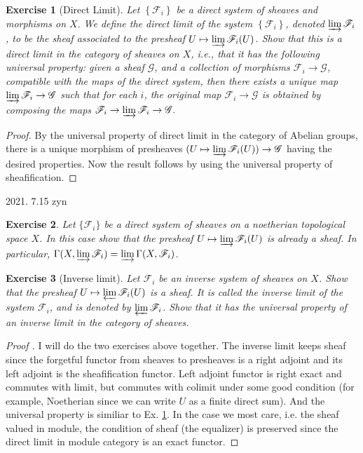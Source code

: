 \documentclass[12pt]{amsart}
\newtheorem{exe}{Exercise}[subsection]
\begin{document}
\begin{exe}[Direct Limit]
	\label{2.1.10}
               Let $\left\{\mathscr{F}_{i}\right\}$ be a direct system of sheaves and morphisms on $X .$ We define the direct limit of the system $\left\{\mathscr{F}_{i}\right\}$, denoted $\varinjlim\mathscr{F}_{i}$, to be the sheaf associated to the presheaf $U \mapsto \varinjlim \mathscr{F}_{i}(U)$. Show that this is a direct limit in the category of sheaves on $X$, i.e., that it has the following universal property: given a sheaf $\mathscr{G}$, and a collection of morphisms $\mathscr{F}_{i} \rightarrow \mathscr{G}$, compatible with the maps of the direct
system, then there exists a unique map $\varinjlim \mathscr{F}_{i} \rightarrow \mathscr{G}$ such that for each $i$, the original map $\mathscr{F}_{i} \rightarrow \mathscr{G}$ is obtained by composing the maps $\mathscr{F}_{i} \rightarrow \varinjlim \mathscr{F}_{i} \rightarrow \mathscr{G} .$
\end{exe}

\begin{proof}
               By the universal property of direct limit in the category of Abelian groups, there is a unique morphism of presheaves $(U\mapsto\varinjlim \mathscr{F}_{i}(U))\rightarrow\mathscr{G}$ having the desired properties. Now the result follows by using the universal property of sheafification.
\end{proof}

2021. 7.15 zyn
\begin{exe}
Let $\lbrace \mathscr{F}_{i}   \rbrace$ be a direct system of sheaves on a noetherian topological space $X$.  In this case show that the presheaf  $U \mapsto \varinjlim\mathscr{F}_{i}(U)$ is already a sheaf.  In particular,  $\Gamma(X,\varinjlim{\mathscr{F}_{i}})=\varinjlim{\Gamma(X,\mathscr{F}_{i})}$.
\end{exe}
\begin{exe}[Inverse limit]
Let ${\mathscr{F}_{i}}$ be an inverse system of sheaves on $X$.  Show that the presheaf $U \mapsto \varprojlim\mathscr{F}_{i}(U)$ is a sheaf.  It is called the inverse limit of the system ${\mathscr{F}_{i}}$,  and is denoted by $\varprojlim\mathscr{F}_{i}$.  Show that it has the universal property of an inverse limit in the category of sheaves.
\end{exe}
\begin{proof}[Proof \footnotemark]
I will do the two exercises above together.  The inverse limit keeps sheaf since the forgetful functor from sheaves to presheaves is a right adjoint and its left adjoint is the sheafification functor.  Left adjoint functor is right exact and commutes with limit, but commutes with colimit under some good condition (for example,  Noetherian since we can write $U$ as a finite direct sum). And the universal property is similiar to Ex. \ref{2.1.10}.
In the case we most care,  i.e.  the sheaf valued in module,  the condition of sheaf (the equalizer) is preserved since the direct limit in module category is an exact functor.
\end{proof}
\end{document}

